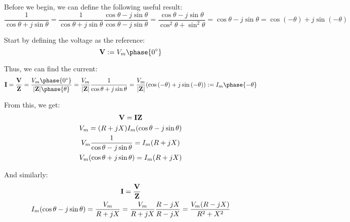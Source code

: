 \documentclass{article}
\begin{document}
Before we begin, we can define the following useful result:
\begin{equation*}
    \frac{1}{\cos{\theta} + j \sin{\theta}}
        = \frac{1}{\cos{\theta} + j \sin{\theta}} \frac{\cos{\theta} - j \sin{\theta}}{\cos{\theta} - j \sin{\theta}}
        = \frac{\cos{\theta} - j \sin{\theta}}{\cos^2{\theta} + \sin^2{\theta}}
        = \cos{\theta} - j \sin{\theta}
        = \cos{(-\theta)} + j \sin{(-\theta)}
\end{equation*}

Start by defining the voltage as the reference:
\begin{equation*}
    \mathbf{V} := V_m \phase{\ang{0}}
\end{equation*}

Thus, we can find the current:
\begin{equation*}
    \mathbf{I}
        = \frac{\mathbf{V}}{\mathbf{Z}}
        = \frac{V_m \phase{\ang{0}}}{\abs*{\mathbf{Z}} \phase{\theta}}
        = \frac{V_m}{\abs*{\mathbf{Z}}} \frac{1}{\cos{\theta} + j \sin{\theta}}
        = \frac{V_m}{\abs*{\mathbf{Z}}} \parens*{\cos{(-\theta)} + j \sin{(-\theta)}}
        := I_m \phase{-\theta}
\end{equation*}

From this, we get:
\begin{gather*}
    \mathbf{V}
        = \mathbf{I} \mathbf{Z}
        \\
    V_m
        = \parens*{R + jX} I_m \parens*{\cos{\theta} - j \sin{\theta}}
        \\
    V_m \frac{1}{\cos{\theta} - j \sin{\theta}}
        = I_m \parens*{R + jX}
        \\
    V_m \parens*{\cos{\theta} + j \sin{\theta}}
        = I_m \parens*{R + jX}
\end{gather*}

And similarly:
\begin{gather*}
    \mathbf{I}
        = \frac{\mathbf{V}}{\mathbf{Z}}
        \\
    I_m \parens*{\cos{\theta} - j \sin{\theta}}
        = \frac{V_m}{R + jX}
        = \frac{V_m}{R + jX} \frac{R - jX}{R - jX}
        = \frac{V_m \parens*{R - jX}}{R^2 + X^2}
\end{gather*}
\end{document}
